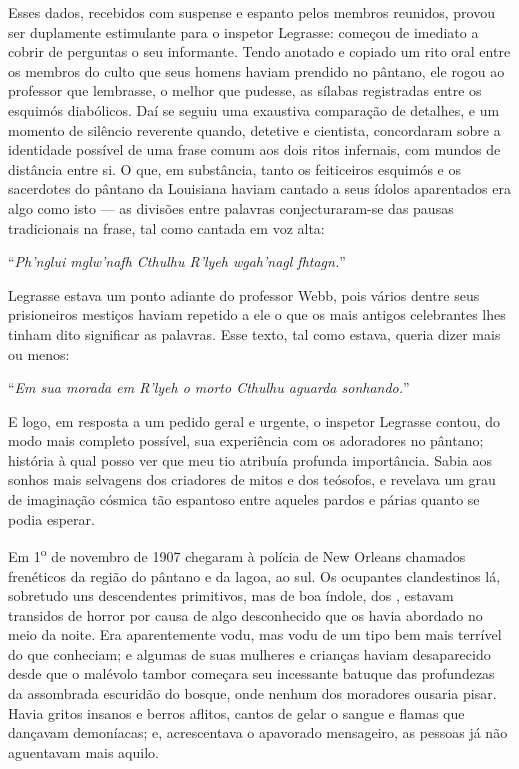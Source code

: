 \begin{pages}
\begin{Rightside}
Esses dados, recebidos com suspense e espanto pelos membros reunidos,
provou ser duplamente estimulante para o inspetor Legrasse: começou de
imediato a cobrir de perguntas o seu informante. Tendo anotado e copiado
um rito oral entre os membros do culto que seus homens haviam prendido
no pântano, ele rogou ao professor que lembrasse, o melhor que pudesse,
as sílabas registradas entre os esquimós diabólicos. Daí se seguiu uma
exaustiva comparação de detalhes, e um momento de silêncio reverente
quando, detetive e cientista, concordaram sobre a identidade possível de
uma frase comum aos dois ritos infernais, com mundos de distância entre
si. O que, em substância, tanto os feiticeiros esquimós e os sacerdotes
do pântano da Louisiana haviam cantado a seus ídolos aparentados era
algo como isto --- as divisões entre palavras conjecturaram-se das
pausas tradicionais na frase, tal como cantada em voz alta:

``\emph{Ph'nglui mglw'nafh Cthulhu R'lyeh wgah'nagl fhtagn.}''

Legrasse estava um ponto adiante do professor Webb, pois vários dentre
seus prisioneiros mestiços haviam repetido a ele o que os mais antigos
celebrantes lhes tinham dito significar as palavras. Esse texto, tal
como estava, queria dizer mais ou menos:

``\emph{Em sua morada em R'lyeh o morto Cthulhu aguarda sonhando.}''

E logo, em resposta a um pedido geral e urgente, o inspetor Legrasse
contou, do modo mais completo possível, sua experiência com os
adoradores no pântano; história à qual posso ver que meu tio atribuía
profunda importância. Sabia aos sonhos mais selvagens dos criadores de
mitos e dos teósofos, e revelava um grau de imaginação cósmica tão
espantoso entre aqueles pardos e párias quanto se podia esperar.

Em 1\textsuperscript{o} de novembro de 1907 chegaram à polícia de
New Orleans chamados frenéticos da região do pântano e da lagoa, ao sul.
Os ocupantes clandestinos lá, sobretudo uns descendentes primitivos, mas
de boa índole, dos ,
estavam transidos de horror por causa de algo desconhecido que os havia
abordado no meio da noite. Era aparentemente vodu, mas vodu de um tipo
bem mais terrível do que conheciam; e algumas de suas mulheres e
crianças haviam desaparecido desde que o malévolo tambor começara seu
incessante batuque das profundezas da assombrada escuridão do bosque,
onde nenhum dos moradores ousaria pisar. Havia gritos insanos e berros
aflitos, cantos de gelar o sangue e flamas que dançavam demoníacas; e,
acrescentava o apavorado mensageiro, as pessoas já não aguentavam mais
aquilo.


\end{Rightside}
\end{pages}
